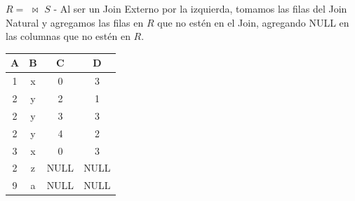 \item $R=$ $\mathrel{\!\!\bowtie}$ $S$ - Al ser un Join Externo por la izquierda, tomamos las filas del Join Natural y agregamos las filas en $R$ que no estén en el Join, agregando NULL en las columnas que no estén en $R$.

\begin{center}
\begin{tabular}{cccc}
\toprule
\textbf{A} & \textbf{B} & \textbf{C} & \textbf{D} \\
\midrule
1 & x & 0 & 3 \\
2 & y & 2 & 1 \\
2 & y & 3 & 3 \\
2 & y & 4 & 2 \\
3 & x & 0 & 3 \\
2 & z & NULL & NULL \\
9 & a & NULL & NULL \\
\bottomrule
\end{tabular}
\end{center}
